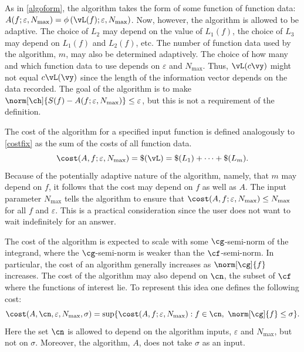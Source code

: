 \documentclass[]{elsarticle}
\theoremstyle{definition}
\theoremstyle{remark}
\begin{document}
As in \eqref{algoform}, the algorithm takes the form of some function of function data: $A(f;\varepsilon,N_{\max}) = \phi\left(\vL(f);\varepsilon,N_{\max}\right)$.
Now, however, the algorithm is allowed to be adaptive. The choice of $L_2$ may depend on the value of $L_1(f)$, the choice of $L_3$ may depend on $L_1(f)$ and $L_2(f)$, etc.  The number of function data used by the algorithm, $m$, may also be determined adaptively. The choice of how many and which function data to use depends on $\varepsilon$ and $N_{\max}$.  Thus, $\vL(c\vy)$ might not equal $c\vL(\vy)$ since the length of the information vector depends on the data recorded.  The goal of the algorithm is to make $\norm[\ch]{S(f) - A(f;\varepsilon,N_{\max})} \le \varepsilon$, but this is not a requirement of the definition.

The cost of the algorithm for a specified input function is defined analogously to \eqref{costfix} as the sum of the costs of all function data.
\[
\cost(A,f;\varepsilon,N_{\max}) = \$(\vL) = \$(L_1) + \cdots +\$(L_m).
\]
Because of the potentially adaptive nature of the algorithm, namely, that $m$ may depend on $f$, it follows that the cost may depend on $f$ as well as $A$. The input parameter $N_{\max}$ tells the algorithm to ensure that $\cost(A,f;\varepsilon,N_{\max}) \le N_{\max}$ for all $f$ and $\varepsilon$.  This is a practical consideration since the user does not want to wait indefinitely for an answer.  

The cost of the algorithm is expected to scale with some $\cg$-semi-norm of the integrand, where the $\cg$-semi-norm is weaker than the $\cf$-semi-norm.  In particular, the cost of an algorithm generally increases as $\norm[\cg]{f}$ increases.  The cost of the algorithm may also depend on $\cn$, the subset of $\cf$ where the functions of interest lie.  To represent this idea one defines the following cost:
\begin{equation*}
\cost(A,\cn,\varepsilon,N_{\max},\sigma)
= \sup \{ \cost(A,f;\varepsilon,N_{\max}) : f \in \cn, \ \norm[\cg]{f} \le \sigma \} .
\end{equation*}
Here the set $\cn$ is allowed to depend on the algorithm inputs, $\varepsilon$ and $N_{\max}$, but not on $\sigma$.  Moreover, the algorithm, $A$, does not take $\sigma$ as an input.
\end{document}
